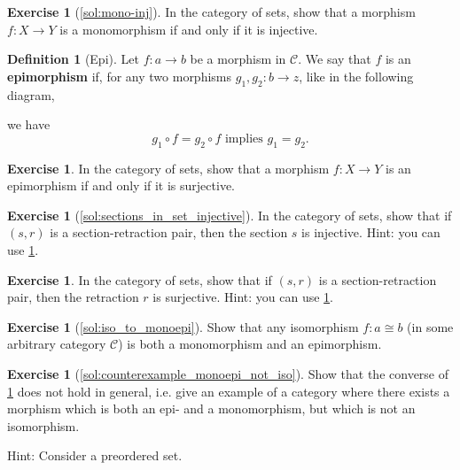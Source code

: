 \documentclass[a4paper,11pt, oneside,titlepage=false]{scrbook}
\theoremstyle{plain}
\theoremstyle{definition}
\newtheorem{dfn}[thm]{Definition}
\newtheorem{exer}[thm]{Exercise}
\newcommand{\Cat}[1]{\mathcal{#1}}
\newcommand{\CC}{\Cat{C}}
\newcommand{\co}[2]{\ensuremath{#2 \circ #1}}
\begin{document}
\begin{exer}[\cref{sol:mono-inj}]\label{ex:mono-inj}
  In the category of sets, show that a morphism $f : X \to Y$ is a monomorphism if and only if it is injective.
\end{exer}

\begin{dfn}[Epi]
  Let $f : a \to b$ be a morphism in $\CC$. We say that $f$ is an \textbf{epimorphism} if, for any two morphisms $g_1, g_2 : b \to z$, like in the following diagram,
  \begin{center}
  \end{center}
  we have
  \[ \co{f}{g_1} = \co{f}{g_2} \text{ implies } g_1 = g_2 .\]
\end{dfn}

\begin{exer}\label{ex:epi-surj}
  In the category of sets, show that a morphism $f : X \to Y$ is an epimorphism if and only if it is surjective.
\end{exer}


\begin{exer}[\cref{sol:sections_in_set_injective}]\label{exer:sections_in_set_injective}
  In the category of sets, show that if $(s,r)$ is a section-retraction pair, then the section $s$ is injective.
  Hint: you can use \cref{ex:mono-inj}.
\end{exer}
\begin{exer}
  In the category of sets, show that if $(s,r)$ is a section-retraction pair, then the retraction $r$ is surjective.
    Hint: you can use \cref{ex:epi-surj}.
\end{exer}

\begin{exer}[\cref{sol:iso_to_monoepi}]\label{exer:iso_to_monoepi}
  Show that any isomorphism $f : a\cong b$ (in some arbitrary category $\CC$) is both a monomorphism and an epimorphism.
\end{exer}

\begin{exer}[\cref{sol:counterexample_monoepi_not_iso}]\label{exer:counterexample_monoepi_not_iso}
  Show that the converse of \cref{exer:iso_to_monoepi} does not hold in general, i.e. give an example of a category where there exists a morphism which is both an epi- and a monomorphism, but which is not an isomorphism.

Hint: Consider a preordered set.
\end{exer}
\end{document}
